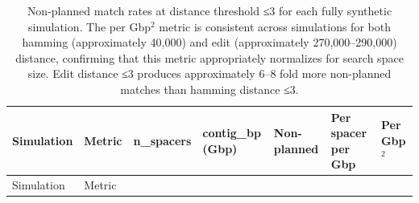 \documentclass[
]{article}
\begin{document}
\begin{longtable}[]{@{}
  >{\raggedright\arraybackslash}p{}
  >{\raggedright\arraybackslash}p{}
  >{\raggedleft\arraybackslash}p{}
  >{\raggedleft\arraybackslash}p{}
  >{\raggedleft\arraybackslash}p{}
  >{\raggedleft\arraybackslash}p{}
  >{\raggedleft\arraybackslash}p{}@{}}
\caption{Non-planned match rates at distance threshold ≤3 for each fully
synthetic simulation. The per Gbp\(^2\) metric is consistent across
simulations for both hamming (approximately 40,000) and edit
(approximately 270,000--290,000) distance, confirming that this metric
appropriately normalizes for search space size. Edit distance ≤3
produces approximately 6--8 fold more non-planned matches than hamming
distance ≤3.}\tabularnewline
\toprule\noalign{}
\begin{minipage}[b]{\linewidth}\raggedright
Simulation
\end{minipage} & \begin{minipage}[b]{\linewidth}\raggedright
Metric
\end{minipage} & \begin{minipage}[b]{\linewidth}\raggedleft
n\_spacers
\end{minipage} & \begin{minipage}[b]{\linewidth}\raggedleft
contig\_bp (Gbp)
\end{minipage} & \begin{minipage}[b]{\linewidth}\raggedleft
Non-planned
\end{minipage} & \begin{minipage}[b]{\linewidth}\raggedleft
Per spacer per Gbp
\end{minipage} & \begin{minipage}[b]{\linewidth}\raggedleft
Per Gbp\(^2\)
\end{minipage} \\
\midrule\noalign{}
\endfirsthead
\toprule\noalign{}
\begin{minipage}[b]{\linewidth}\raggedright
Simulation
\end{minipage} & \begin{minipage}[b]{\linewidth}\raggedright
Metric
\end{minipage} & \begin{minipage}[b]{\linewidth}\raggedleft

\end{minipage}
\end{longtable}
\end{document}
